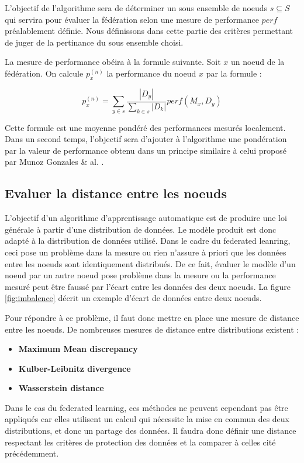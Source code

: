 \documentclass[stage3a]{tnreport} %
\begin{document}
L'objectif de l'algorithme sera de déterminer un sous ensemble de noeuds $s \subseteq S$ qui servira pour évaluer la fédération selon une mesure de performance $perf$ préalablement définie. Nous définissons dans cette partie des critères permettant de juger de la pertinance du sous ensemble choisi.

La mesure de performance obéira à la formule suivante. Soit $x$ un noeud de la fédération. On calcule $p_x^{(n)}$ la performance du noeud $x$ par la formule :

\begin{equation}
  p_x^{(n)} = \sum_{y\in s} \frac{|D_y|}{\sum_{k\in s} |D_k|} perf(M_x,D_y)
\end{equation}

Cette formule est une moyenne pondéré des performances mesurés localement. Dans un second temps, l'objectif sera d'ajouter à l'algorithme une pondération par la valeur de performance obtenu dans un principe similaire à celui proposé par Munoz Gonzales \& al. .

\subsection{Evaluer la distance entre les noeuds}

L'objectif d'un algorithme d'apprentissage automatique est de produire une loi générale à partir d'une distribution de données. Le modèle produit est donc adapté à la distribution de données utilisé. Dans le cadre du federated leanring, ceci pose un problème dans la mesure ou rien n'assure à priori que les données entre les noeuds sont identiquement distribués. De ce fait, évaluer le modèle d'un noeud par un autre noeud pose problème dans la mesure ou la performance mesuré peut être faussé par l'écart entre les données des deux noeuds. La figure \ref{fig:imbalence} décrit un exemple d'écart de données entre deux noeuds.

Pour répondre à ce problème, il faut donc mettre en place une mesure de distance entre les noeuds. De nombreuses mesures de distance entre distributions existent :

\begin{itemize}
  \item \textbf{Maximum Mean discrepancy}
  \item \textbf{Kulber-Leibnitz divergence}
  \item \textbf{Wasserstein distance}
\end{itemize}

Dans le cas du federated learning, ces méthodes ne peuvent cependant pas être appliqués car elles utilisent un calcul qui nécessite la mise en commun des deux distributions, et donc un partage des données.  Il faudra donc définir une distance respectant les critères de protection des données et la comparer à celles cité précédemment.
\end{document}
